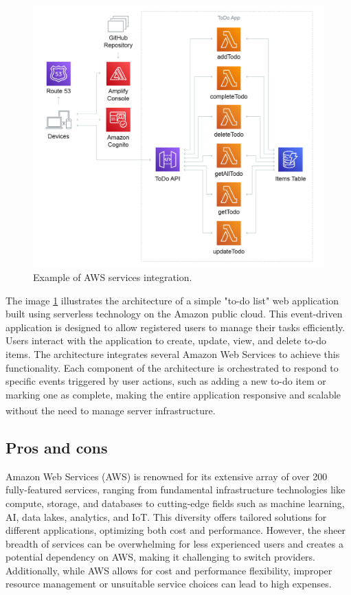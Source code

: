 \begin{figure}
    \centering
    \includegraphics[scale=0.3]{Pictures/3_serverless_example.jpg}
    \caption{Example of AWS services integration.}
    \label{fig:3_aws_example}
\end{figure}

The image \ref{fig:3_aws_example} illustrates the architecture of a simple "to-do list" web
application built using serverless technology on the Amazon public cloud. This event-driven
application is designed to allow registered users to manage their tasks efficiently. Users interact
with the application to create, update, view, and delete to-do items. The architecture integrates
several Amazon Web Services to achieve this functionality. Each component of the architecture is
orchestrated to respond to specific events triggered by user actions, such as adding a new to-do
item or marking one as complete, making the entire application responsive and scalable without the
need to manage server infrastructure\textsuperscript{\cite{serverless_1}}.

\subsection{Pros and cons}
Amazon Web Services (AWS) is renowned for its extensive array of over 200 fully-featured services,
ranging from fundamental infrastructure technologies like compute, storage, and databases to
cutting-edge fields such as machine learning, AI, data lakes, analytics, and IoT. This diversity
offers tailored solutions for different applications, optimizing both cost and performance. However,
the sheer breadth of services can be overwhelming for less experienced users and creates a potential
dependency on AWS, making it challenging to switch providers. Additionally, while AWS allows for
cost and performance flexibility, improper resource management or unsuitable service choices can
lead to high expenses.

